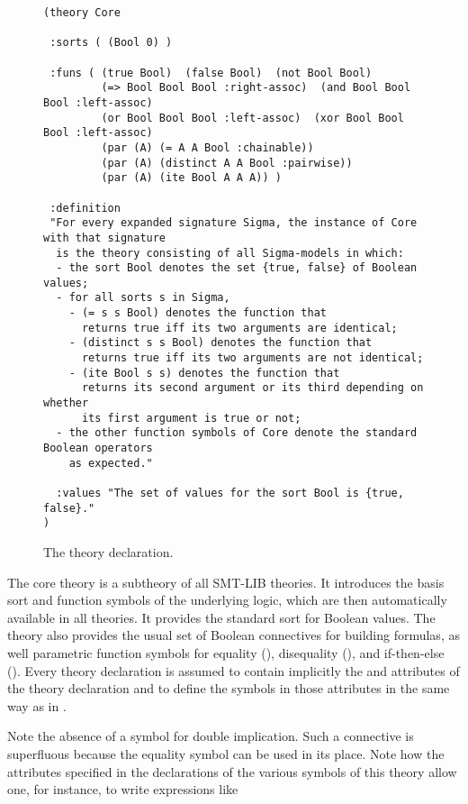 \begin{figure}[t]
\small
{\color{NavyBlue}
\begin{verbatim}
(theory Core

 :sorts ( (Bool 0) )

 :funs ( (true Bool)  (false Bool)  (not Bool Bool)
         (=> Bool Bool Bool :right-assoc)  (and Bool Bool Bool :left-assoc)
         (or Bool Bool Bool :left-assoc)  (xor Bool Bool Bool :left-assoc)
         (par (A) (= A A Bool :chainable))
         (par (A) (distinct A A Bool :pairwise))
         (par (A) (ite Bool A A A)) )

 :definition
 "For every expanded signature Sigma, the instance of Core with that signature
  is the theory consisting of all Sigma-models in which: 
  - the sort Bool denotes the set {true, false} of Boolean values;
  - for all sorts s in Sigma, 
    - (= s s Bool) denotes the function that
      returns true iff its two arguments are identical;
    - (distinct s s Bool) denotes the function that
      returns true iff its two arguments are not identical;
    - (ite Bool s s) denotes the function that
      returns its second argument or its third depending on whether 
      its first argument is true or not;
  - the other function symbols of Core denote the standard Boolean operators
    as expected."
  
  :values "The set of values for the sort Bool is {true, false}." 
)
\end{verbatim}
}%
\caption{The  theory declaration.}
\label{fig:Core}
\end{figure}

The core theory is a subtheory of all SMT-LIB theories.
It introduces the basis sort and function symbols of the underlying logic,
which are then automatically available in all theories.
It provides the standard  sort for Boolean values.
The theory also provides the usual set of Boolean connectives for building formulas,
as well parametric function symbols for equality (\ter{=}), disequality (), and
if-then-else ().
Every theory declaration is assumed 
to contain implicitly the  and  attributes 
of the  theory declaration and 
to define the symbols in those attributes in the same way as in .




Note the absence of a symbol for double implication.
Such a connective is superfluous 
because the equality symbol \ter{=} can be used in its place. 
Note how the attributes specified in the declarations of the various symbols
of this theory allow one, for instance, to write expressions like 

